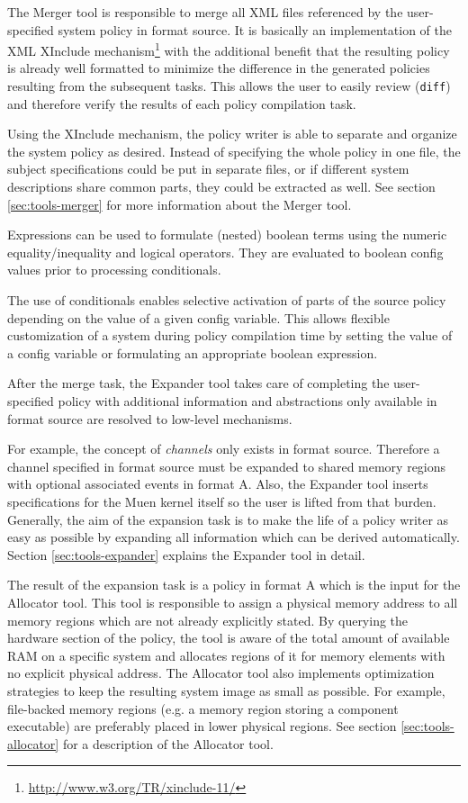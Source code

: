 \documentclass[a4paper,twoside,titlepage]{article}
\begin{document}
The Merger tool is responsible to merge all XML files referenced by the
user-specified system policy in format source. It is basically an implementation
of the XML XInclude mechanism\footnote{\url{http://www.w3.org/TR/xinclude-11/}}
with the additional benefit that the resulting policy is already well formatted
to minimize the difference in the generated policies resulting from the
subsequent tasks.  This allows the user to easily review (\texttt{diff}) and
therefore verify the results of each policy compilation task.

Using the XInclude mechanism, the policy writer is able to separate and organize
the system policy as desired. Instead of specifying the whole policy in one
file, the subject specifications could be put in separate files, or if different
system descriptions share common parts, they could be extracted as well. See
section \ref{sec:tools-merger} for more information about the Merger tool.

Expressions can be used to formulate (nested) boolean terms using the numeric
equality/inequality and logical operators. They are evaluated to boolean config
values prior to processing conditionals.

The use of conditionals enables selective activation of parts of the source
policy depending on the value of a given config variable. This allows flexible
customization of a system during policy compilation time by setting the value
of a config variable or formulating an appropriate boolean expression.

After the merge task, the Expander tool takes care of completing the
user-specified policy with additional information and abstractions only
available in format source are resolved to low-level mechanisms.

For example, the concept of \emph{channels} only exists in format source.
Therefore a channel specified in format source must be expanded to shared memory
regions with optional associated events in format A.  Also, the Expander tool
inserts specifications for the Muen kernel itself so the user is lifted from
that burden. Generally, the aim of the expansion task is to make the life of a
policy writer as easy as possible by expanding all information which can be
derived automatically. Section \ref{sec:tools-expander} explains the Expander
tool in detail.

The result of the expansion task is a policy in format A which is the input for
the Allocator tool. This tool is responsible to assign a physical memory
address to all memory regions which are not already explicitly stated. By
querying the hardware section of the policy, the tool is aware of the total
amount of available RAM on a specific system and allocates regions of it for
memory elements with no explicit physical address.  The Allocator tool also
implements optimization strategies to keep the resulting system image as small
as possible.  For example, file-backed memory regions (e.g. a memory region
storing a component executable) are preferably placed in lower physical
regions. See section \ref{sec:tools-allocator} for a description of the
Allocator tool.
\end{document}
